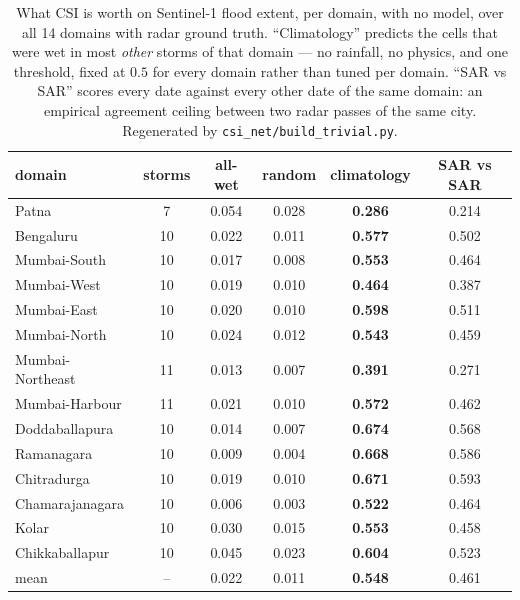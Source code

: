 \documentclass[10pt]{article}
\begin{document}
\begin{table}[t]
\centering\small
\caption{What CSI is worth on Sentinel-1 flood extent, per domain, with no model, over all 14
domains with radar ground truth. ``Climatology'' predicts the cells that were wet in most
\emph{other} storms of that domain --- no rainfall, no physics, and one threshold, fixed at
$0.5$ for every domain rather than tuned per domain. ``SAR vs SAR'' scores every date against
every other date of the same domain: an empirical agreement ceiling between two radar passes of
the same city. Regenerated by \texttt{csi\_net/build\_trivial.py}.}
\label{tab:trivial}
\begin{tabular}{lccccc}
\toprule
domain & storms & all-wet & random & climatology & SAR vs SAR \\
\midrule
Patna            &  7 & 0.054 & 0.028 & \textbf{0.286} & 0.214 \\
Bengaluru        & 10 & 0.022 & 0.011 & \textbf{0.577} & 0.502 \\
\midrule
Mumbai-South     & 10 & 0.017 & 0.008 & \textbf{0.553} & 0.464 \\
Mumbai-West      & 10 & 0.019 & 0.010 & \textbf{0.464} & 0.387 \\
Mumbai-East      & 10 & 0.020 & 0.010 & \textbf{0.598} & 0.511 \\
Mumbai-North     & 10 & 0.024 & 0.012 & \textbf{0.543} & 0.459 \\
Mumbai-Northeast & 11 & 0.013 & 0.007 & \textbf{0.391} & 0.271 \\
Mumbai-Harbour   & 11 & 0.021 & 0.010 & \textbf{0.572} & 0.462 \\
\midrule
Doddaballapura   & 10 & 0.014 & 0.007 & \textbf{0.674} & 0.568 \\
Ramanagara       & 10 & 0.009 & 0.004 & \textbf{0.668} & 0.586 \\
Chitradurga      & 10 & 0.019 & 0.010 & \textbf{0.671} & 0.593 \\
Chamarajanagara  & 10 & 0.006 & 0.003 & \textbf{0.522} & 0.464 \\
Kolar            & 10 & 0.030 & 0.015 & \textbf{0.553} & 0.458 \\
Chikkaballapur   & 10 & 0.045 & 0.023 & \textbf{0.604} & 0.523 \\
\midrule
mean             & -- & 0.022 & 0.011 & \textbf{0.548} & 0.461 \\
\bottomrule
\end{tabular}
\end{table}
\end{document}
